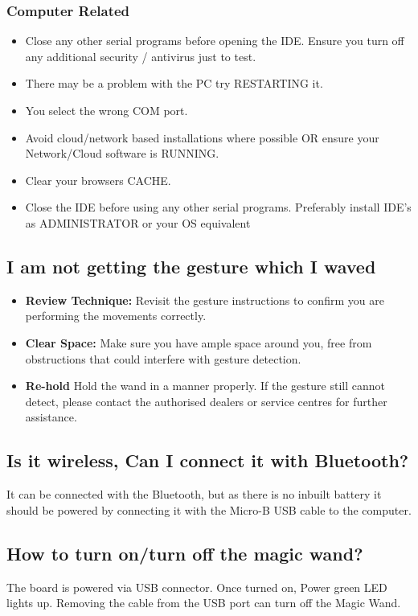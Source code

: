 \subsubsection{Computer Related}

\begin{itemize}
	\item Close any other serial programs before opening the IDE.
	Ensure you turn off any additional security / antivirus just to test.
	\item There may be a problem with the PC try RESTARTING it.
	\item You select the wrong COM port.
	\item Avoid cloud/network based installations where possible OR ensure your Network/Cloud software is RUNNING.
	\item Clear your browsers CACHE.
	\item Close the IDE before using any other serial programs.
	Preferably install IDE’s as ADMINISTRATOR or your OS equivalent
\end{itemize}
	
\subsection{I am not getting the gesture which I waved}
	\begin{itemize}
		\item \textbf{Review Technique:} Revisit the gesture instructions to confirm you are performing the movements correctly.
		\item \textbf{Clear Space:} Make sure you have ample space around you, free from obstructions that could interfere with gesture detection.
		\item \textbf{Re-hold} Hold the wand in a manner properly. If the gesture still cannot detect, please contact the authorised dealers or service centres for further assistance. 
	\end{itemize}
	
\subsection{Is it wireless, Can I connect it with Bluetooth?}
	It can be connected with the Bluetooth, but as there is no inbuilt battery it should be powered by connecting it with the Micro-B USB cable to the computer.
	
\subsection{How to turn on/turn off the magic wand?}
	The board is powered via USB connector. Once turned on, Power green LED lights up. Removing the cable from the USB port can turn off the Magic Wand. 

